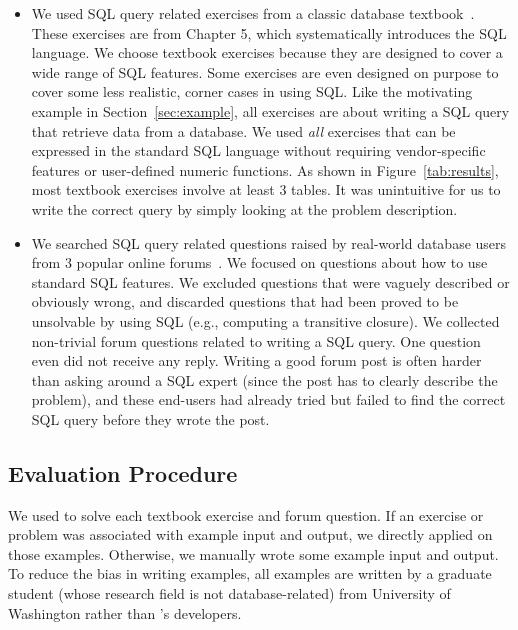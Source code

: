 \begin{itemize}
\item We used \allex SQL query related exercises
from a classic database textbook~\cite{cowbook}.
These exercises are from Chapter 5, which systematically
introduces the SQL language. We choose textbook exercises because they
are designed to
cover a wide range of SQL features. Some exercises
are even designed on purpose to cover some less realistic,
corner cases in using SQL. Like the motivating
example in Section~\ref{sec:example}, all exercises are about
writing a SQL query that retrieve data from a database.
We used \textit{all} exercises that can be expressed in the standard
SQL language without requiring vendor-specific
features or user-defined numeric functions.
As shown in Figure~\ref{tab:results},
most textbook exercises involve at least 3 tables. It was unintuitive
for us to write the correct query by simply looking at the problem
description.

\item We searched SQL query related questions raised by real-world
database users from 3 popular online forums~\cite{stackoverflow,
tutorialized, dbjournal}.
We focused on questions about how to use standard SQL features.
We excluded questions that were vaguely described or obviously
wrong, and discarded questions that had been proved
to be unsolvable by using SQL (e.g., computing a
transitive closure).
We collected \pnum non-trivial forum questions related to writing a SQL query.
One question even did not receive any reply.
Writing a good forum post is often harder than asking
around a SQL expert (since the post has to clearly 
describe the problem), and these end-users had already tried but
failed to find the correct SQL query before they wrote the post.
\end{itemize}



\subsection{Evaluation Procedure}

We used \ourtool to solve each textbook exercise and forum
question. If an exercise or problem
was associated with example input and output,
we directly applied \ourtool on those examples.
Otherwise, we manually wrote some example input and output.
To reduce the bias in writing
examples, all examples are written by a graduate
student (whose research field is not database-related) from University of Washington rather than
\ourtool's developers.

